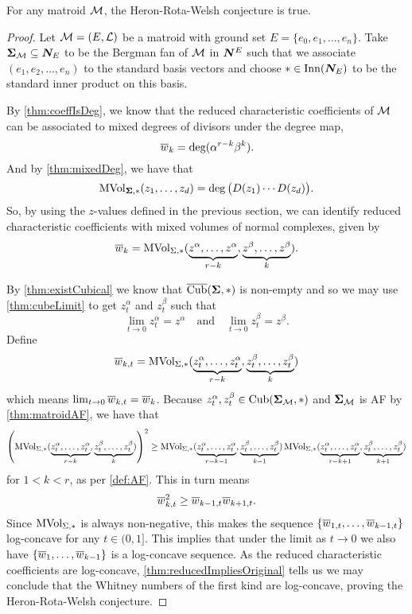 \documentclass[12pt,oneside]{../../sfsuthesis}
\begin{document}
\begin{Result}
    For any matroid \( \mathcal{M} \), the Heron-Rota-Welsh conjecture is true.
\end{Result}
\begin{proof}
    Let \( \mathcal{M} = (E, \mathcal{L}) \) be a matroid with ground set \( E = \{ e_0, e_1, \dots, e_n \} \).
    Take \( \bm{\Sigma}_{\mathcal{M}} \subseteq \bm{N}_E \) to be the Bergman fan of \( \mathcal{M} \) in \( \bm{N}^E \) such that we associate \( (e_1, e_2, \dots, e_n) \) to the standard basis vectors and choose \( \ast \in \operatorname{Inn}(\bm{N}_E) \) to be the standard inner product on this basis.

    By \th\ref{thm:coeffIsDeg}, we know that the reduced characteristic coefficients of \( \mathcal{M} \) can be associated to mixed degrees of divisors under the degree map,
    \[
        \overline{w}_k = \deg(\alpha^{r-k}\beta^k).
    \]
    And by \th\ref{thm:mixedDeg}, we have that
    \[
        \operatorname{MVol}_{\bm{\Sigma}, \ast}(z_1, \dots, z_d) = \deg\big( D(z_1) \cdots D(z_d) \big).
    \]
    So, by using the \( z \)-values defined in the previous section, we can identify reduced characteristic coefficients with mixed volumes of normal complexes, given by
    \[
        \overline{w}_k = \operatorname{MVol}_{\Sigma, \ast}(\underbrace{z^\alpha,\ldots,z^\alpha}_{r-k},\underbrace{z^\beta,\ldots,z^\beta}_{k}).
    \]

    By \th\ref{thm:existCubical} we know that \( \operatorname{\overline{Cub}}(\bm{\Sigma}, \ast) \) is non-empty and so we may use \th\ref{thm:cubeLimit} to get \( z_t^\alpha \) and \( z_t^\beta \) such that
    \[
        \lim_{t \to 0 } z_t^\alpha = z^\alpha \quad \text{and} \quad  \lim_{t \to 0 } z_t^\beta = z^\beta.
    \]
    Define
    \[
        \overline{w}_{k,t} = \operatorname{MVol}_{\Sigma, \ast}(\underbrace{z_t^\alpha,\ldots,z_t^\alpha}_{r-k},\underbrace{z_t^\beta,\ldots,z_t^\beta}_{k})
    \]
    which means \( \lim_{t \to 0} \overline{w}_{k,t} = \overline{w}_k \).
    Because \( z_t^\alpha, z_t^\beta \in \operatorname{Cub}(\bm{\Sigma}_{\mathcal{M}}, \ast) \) and \( \bm{\Sigma}_{\mathcal{M}} \) is AF by \th\ref{thm:matroidAF}, we have that
    \[
        \left(\operatorname{MVol}_{\Sigma, \ast}(\underbrace{z_t^\alpha,\ldots,z_t^\alpha}_{r-k},\underbrace{z_t^\beta,\ldots,z_t^\beta}_{k})\right)^2
        \geq
        \operatorname{MVol}_{\Sigma, \ast}(\underbrace{z_t^\alpha,\ldots,z_t^\alpha}_{r-k-1},\underbrace{z_t^\beta,\ldots,z_t^\beta}_{k-1})
        \operatorname{MVol}_{\Sigma, \ast}(\underbrace{z_t^\alpha,\ldots,z_t^\alpha}_{r-k+1},\underbrace{z_t^\beta,\ldots,z_t^\beta}_{k+1})
    \]
    for \( 1 < k < r \), as per \th\ref{def:AF}.
    This in turn means
    \[
        \overline{w}_{k,t}^2 \geq \overline{w}_{k-1,t}\overline{w}_{k+1,t}.
    \]
    Since \( \operatorname{MVol}_{\Sigma, \ast} \) is always non-negative, this makes the sequence \( \{ \overline{w}_{1,t}, \dots, \overline{w}_{k-1,t}  \} \) log-concave for any \( t \in (0,1] \).
    This implies that under the limit as \( t \to 0 \) we also have \( \{ \overline{w}_{1}, \dots, \overline{w}_{k-1} \} \) is a log-concave sequence.
    As the reduced characteristic coefficients are log-concave, \th\ref{thm:reducedImpliesOriginal} tells us we may conclude that the Whitney numbers of the first kind are log-concave, proving the Heron-Rota-Welsh conjecture.

\end{proof}
\end{document}
